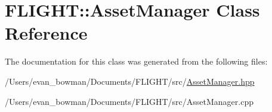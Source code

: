 \hypertarget{class_f_l_i_g_h_t_1_1_asset_manager}{}\section{F\+L\+I\+G\+HT\+:\+:Asset\+Manager Class Reference}
\label{class_f_l_i_g_h_t_1_1_asset_manager}


The documentation for this class was generated from the following files\+:\begin{DoxyCompactItemize}
\item 
/\+Users/evan\+\_\+bowman/\+Documents/\+F\+L\+I\+G\+H\+T/src/\hyperlink{_asset_manager_8hpp}{Asset\+Manager.\+hpp}\item 
/\+Users/evan\+\_\+bowman/\+Documents/\+F\+L\+I\+G\+H\+T/src/Asset\+Manager.\+cpp\end{DoxyCompactItemize}
